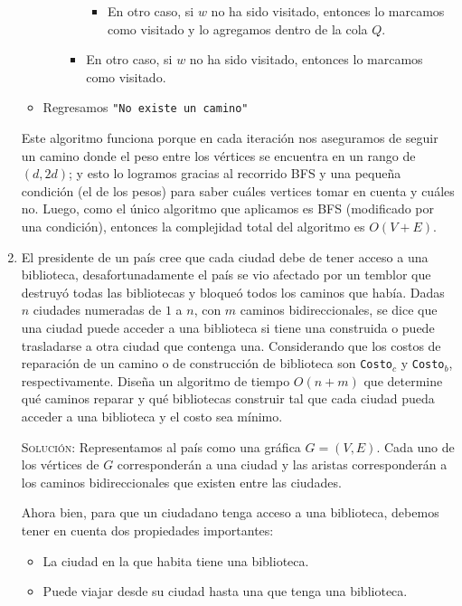 \documentclass[letterpaper,11pt]{article}
\begin{document}
\begin{enumerate}
\begin{itemize}
\begin{itemize}
\begin{itemize}
\begin{itemize}
                    \item En otro caso, si $w$ no ha sido visitado, entonces 
                    lo marcamos como visitado y lo agregamos dentro de la 
                    cola $Q$.
                \end{itemize}

                \item En otro caso, si $w$ no ha sido visitado, entonces lo 
                marcamos como visitado.
            \end{itemize}
        \end{itemize}

        \item Regresamos \texttt{"No existe un camino"}
    \end{itemize}

    Este algoritmo funciona porque en cada iteración nos aseguramos de seguir 
    un camino donde el peso entre los vértices se encuentra en un rango de 
    $(d, 2d)$; y esto lo logramos gracias al recorrido BFS y una pequeña 
    condición (el de los pesos) para saber cuáles vertices tomar en cuenta y 
    cuáles no. Luego, como el único algoritmo que aplicamos es BFS (modificado 
    por una condición), entonces la complejidad total del algoritmo es 
    $O(V+E)$.
    
    \item El presidente de un país cree que cada ciudad debe de tener acceso 
    a una biblioteca, desafortunadamente el país se vio afectado por un temblor
    que destruyó todas las bibliotecas y bloqueó todos los caminos que había. 
    Dadas $n$ ciudades numeradas de $1$ a $n$, con $m$ caminos bidireccionales, 
    se dice que una ciudad puede acceder a una biblioteca si tiene una construida
    o puede trasladarse a otra ciudad que contenga una. Considerando que los 
    costos de reparación de un camino o de construcción de biblioteca son 
    \texttt{Costo}$_c$ y \texttt{Costo}$_b$, respectivamente. Diseña un algoritmo 
    de tiempo $O(n + m)$ que determine qué caminos reparar y qué bibliotecas 
    construir tal que cada ciudad pueda acceder a una biblioteca y el costo sea 
    mínimo.

    \textsc{Solución:} Representamos al país como una gráfica $G = (V, E)$. 
    Cada uno de los vértices de $G$ corresponderán a una ciudad y las aristas 
    corresponderán a los caminos bidireccionales que existen entre las 
    ciudades.

    Ahora bien, para que un ciudadano tenga acceso a una biblioteca, debemos 
    tener en cuenta dos propiedades importantes:
    \begin{itemize}
        \item La ciudad en la que habita tiene una biblioteca.
        \item Puede viajar desde su ciudad hasta una que tenga una biblioteca.
    \end{itemize}


\end{enumerate}
\end{document}
